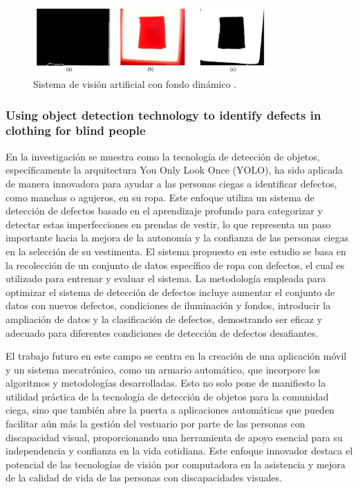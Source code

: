\begin{figure}[H]
	\centering
	\includegraphics[width=0.8\textwidth]{img/luz_sistema.png}
	\caption[Sistema de visión artificial con fondo dinámico.]{Sistema de visión artificial con fondo dinámico \cite{Moreno2017}.}
	\label{fig:luz_sistema}
\end{figure}

\subsubsection{Using object detection technology to identify defects in clothing for blind people}

En la investigación \cite{Rocha2023} se muestra como la tecnología de detección de objetos, específicamente la arquitectura You Only Look Once (YOLO), ha sido aplicada de manera innovadora para ayudar a las personas ciegas a identificar defectos, como manchas o agujeros, en su ropa. Este enfoque utiliza un sistema de detección de defectos basado en el aprendizaje profundo para categorizar y detectar estas imperfecciones en prendas de vestir, lo que representa un paso importante hacia la mejora de la autonomía y la confianza de las personas ciegas en la selección de su vestimenta. El sistema propuesto en este estudio se basa en la recolección de un conjunto de datos específico de ropa con defectos, el cual es utilizado para entrenar y evaluar el sistema. La metodología empleada para optimizar el sistema de detección de defectos incluye aumentar el conjunto de datos con nuevos defectos, condiciones de iluminación y fondos, introducir la ampliación de datos y la clasificación de defectos, demostrando ser eficaz y adecuado para diferentes condiciones de detección de defectos desafiantes.

El trabajo futuro en este campo se centra en la creación de una aplicación móvil y un sistema mecatrónico, como un armario automático, que incorpore los algoritmos y metodologías desarrolladas. Esto no solo pone de manifiesto la utilidad práctica de la tecnología de detección de objetos para la comunidad ciega, sino que también abre la puerta a aplicaciones automáticas que pueden facilitar aún más la gestión del vestuario por parte de las personas con discapacidad visual, proporcionando una herramienta de apoyo esencial para su independencia y confianza en la vida cotidiana. Este enfoque innovador destaca el potencial de las tecnologías de visión por computadora en la asistencia y mejora de la calidad de vida de las personas con discapacidades visuales.

